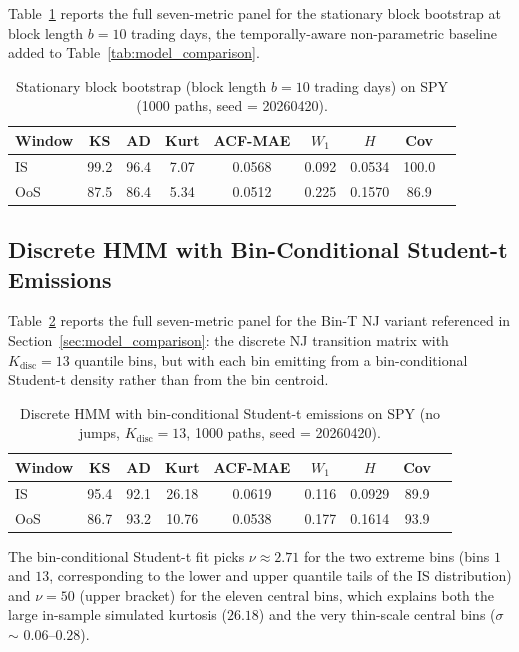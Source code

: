 Table~\ref{tab:block_bootstrap} reports the full seven-metric panel for the stationary block bootstrap at block length $b = 10$ trading days, the temporally-aware non-parametric baseline added to Table~\ref{tab:model_comparison}.

\begin{table}[h]
\centering
\small
\caption{Stationary block bootstrap (block length $b = 10$ trading days) on SPY (1000 paths, seed = 20260420).}
\label{tab:block_bootstrap}
\begin{tabular}{l cc cc c c c c}
\toprule
Window & KS & AD & Kurt & ACF-MAE & $W_1$ & $H$ & Cov \\
\midrule
IS  & 99.2 & 96.4 & 7.07 & 0.0568 & 0.092 & 0.0534 & 100.0 \\
OoS & 87.5 & 86.4 & 5.34 & 0.0512 & 0.225 & 0.1570 & 86.9  \\
\bottomrule
\end{tabular}
\end{table}

\subsection{Discrete HMM with Bin-Conditional Student-t Emissions}
\label{sec:bin_t_supp}

Table~\ref{tab:bin_t} reports the full seven-metric panel for the Bin-T NJ variant referenced in Section~\ref{sec:model_comparison}: the discrete NJ transition matrix with $K_{\text{disc}} = 13$ quantile bins, but with each bin emitting from a bin-conditional Student-t density rather than from the bin centroid.

\begin{table}[h]
\centering
\small
\caption{Discrete HMM with bin-conditional Student-t emissions on SPY (no jumps, $K_{\text{disc}} = 13$, 1000 paths, seed = 20260420).}
\label{tab:bin_t}
\begin{tabular}{l cc cc c c c c}
\toprule
Window & KS & AD & Kurt & ACF-MAE & $W_1$ & $H$ & Cov \\
\midrule
IS  & 95.4 & 92.1 & 26.18 & 0.0619 & 0.116 & 0.0929 & 89.9 \\
OoS & 86.7 & 93.2 & 10.76 & 0.0538 & 0.177 & 0.1614 & 93.9 \\
\bottomrule
\end{tabular}
\end{table}

The bin-conditional Student-t fit picks $\nu \approx 2.71$ for the two extreme bins (bins $1$ and $13$, corresponding to the lower and upper quantile tails of the IS distribution) and $\nu = 50$ (upper bracket) for the eleven central bins, which explains both the large in-sample simulated kurtosis ($26.18$) and the very thin-scale central bins ($\sigma$ $\sim$ $0.06$--$0.28$).



